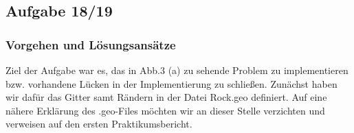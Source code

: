 \subsection{Aufgabe 18/19}
\subsubsection{Vorgehen und Lösungsansätze}
\begin{figure}[H]
	\centering
\end{figure}
Ziel der Aufgabe war es, das in Abb.3 (a) zu sehende Problem zu implementieren bzw. vorhandene Lücken in der Implementierung zu schließen.
Zunächst haben wir dafür das Gitter samt Rändern in der Datei Rock.geo definiert. 
Auf eine nähere Erklärung des .geo-Files möchten wir an dieser Stelle verzichten und verweisen auf den ersten Praktikumsbericht.


